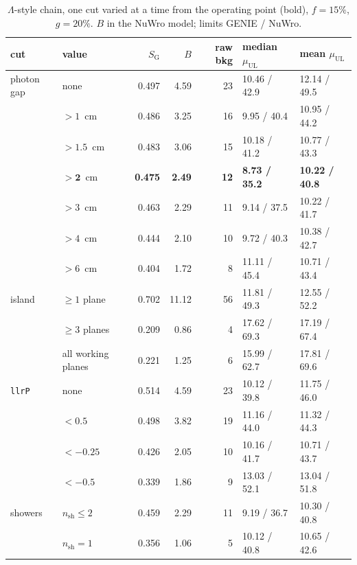 \documentclass[11pt,a4paper]{article}
\newcommand{\Lam}{\ensuremath{\Lambda}}
\newcommand{\muUL}{\ensuremath{\mu_{\mathrm{UL}}}}
\begin{document}
\begin{table}[h]\centering
\caption{\Lam-style chain, one cut varied at a time from the operating point (bold), $f=15\%$,
$g=20\%$. $B$ in the NuWro model; limits GENIE / NuWro.}
\label{tab:lslast}
\small
\begin{tabular}{llrrrll}
\toprule
cut & value & $S_{\mathrm{G}}$ & $B$ & raw bkg & median $\muUL$ & mean $\muUL$ \\
\midrule
photon gap & none        & 0.497 & 4.59 & 23 & 10.46 / 42.9 & 12.14 / 49.5 \\
           & $>1$~cm     & 0.486 & 3.25 & 16 &  9.95 / 40.4 & 10.95 / 44.2 \\
           & $>1.5$~cm   & 0.483 & 3.06 & 15 & 10.18 / 41.2 & 10.77 / 43.3 \\
           & $\mathbf{>2}$~cm & \textbf{0.475} & \textbf{2.49} & \textbf{12} & \textbf{8.73 / 35.2} & \textbf{10.22 / 40.8} \\
           & $>3$~cm     & 0.463 & 2.29 & 11 &  9.14 / 37.5 & 10.22 / 41.7 \\
           & $>4$~cm     & 0.444 & 2.10 & 10 &  9.72 / 40.3 & 10.38 / 42.7 \\
           & $>6$~cm     & 0.404 & 1.72 &  8 & 11.11 / 45.4 & 10.71 / 43.4 \\
\midrule
island     & $\geq1$ plane  & 0.702 & 11.12 & 56 & 11.81 / 49.3 & 12.55 / 52.2 \\
           & $\geq3$ planes & 0.209 & 0.86 &  4 & 17.62 / 69.3 & 17.19 / 67.4 \\
           & all working planes & 0.221 & 1.25 & 6 & 15.99 / 62.7 & 17.81 / 69.6 \\
\midrule
\texttt{llrP} & none     & 0.514 & 4.59 & 23 & 10.12 / 39.8 & 11.75 / 46.0 \\
           & $<0.5$      & 0.498 & 3.82 & 19 & 11.16 / 44.0 & 11.32 / 44.3 \\
           & $<-0.25$    & 0.426 & 2.05 & 10 & 10.16 / 41.7 & 10.71 / 43.7 \\
           & $<-0.5$     & 0.339 & 1.86 &  9 & 13.03 / 52.1 & 13.04 / 51.8 \\
\midrule
showers    & $n_{\mathrm{sh}}\leq2$ & 0.459 & 2.29 & 11 &  9.19 / 36.7 & 10.30 / 40.8 \\
           & $n_{\mathrm{sh}}=1$    & 0.356 & 1.06 &  5 & 10.12 / 40.8 & 10.65 / 42.6 \\
\bottomrule
\end{tabular}
\end{table}
\end{document}
